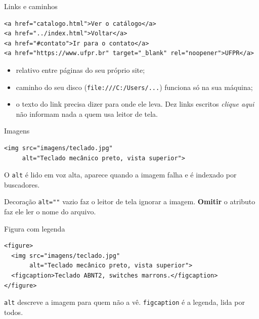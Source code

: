 \documentclass{beamer}
\begin{document}
\begin{frame}[fragile]{Links e caminhos}
  \begin{verbatim}
<a href="catalogo.html">Ver o catálogo</a>
<a href="../index.html">Voltar</a>
<a href="#contato">Ir para o contato</a>
<a href="https://www.ufpr.br" target="_blank" rel="noopener">UFPR</a>
  \end{verbatim}

  \vspace{0.3cm}
  \begin{itemize}
    \item relativo entre páginas do seu próprio site;
    \item caminho do seu disco (\texttt{file:///C:/Users/...}) funciona só na sua
          máquina;
    \item o texto do link precisa dizer para onde ele leva. Dez links escritos
          \textit{clique aqui} não informam nada a quem usa leitor de tela.
  \end{itemize}
\end{frame}

\begin{frame}[fragile]{Imagens}
  \begin{verbatim}
<img src="imagens/teclado.jpg"
     alt="Teclado mecânico preto, vista superior">
  \end{verbatim}

  \vspace{0.3cm}
  O \texttt{alt} é lido em voz alta, aparece quando a imagem falha e é indexado
  por buscadores.

  \begin{block}{Decoração}
    \texttt{alt=""} vazio faz o leitor de tela ignorar a imagem. \textbf{Omitir}
    o atributo faz ele ler o nome do arquivo.
  \end{block}
\end{frame}

\begin{frame}[fragile]{Figura com legenda}
  \begin{verbatim}
<figure>
  <img src="imagens/teclado.jpg"
       alt="Teclado mecânico preto, vista superior">
  <figcaption>Teclado ABNT2, switches marrons.</figcaption>
</figure>
  \end{verbatim}

  \vspace{0.3cm}
  \texttt{alt} descreve a imagem para quem não a vê. \texttt{figcaption} é a
  legenda, lida por todos.
\end{frame}
\end{document}
